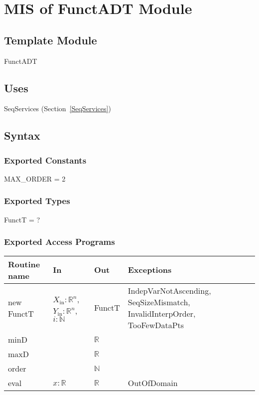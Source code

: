 \documentclass[12pt, titlepage]{article}
\begin{document}
\newpage


\section{MIS of FunctADT Module} \label{FunctADT}

\subsection{Template Module}

FunctADT

\subsection {Uses}

SeqServices (Section~\ref{SeqServices})

\subsection {Syntax}

\subsubsection {Exported Constants}

MAX\_ORDER = 2

\subsubsection {Exported Types}

FunctT = ?

\subsubsection {Exported Access Programs}

\begin{tabular}{| l | l | l | p{5cm} |}
\hline
\textbf{Routine name} & \textbf{In} & \textbf{Out} & \textbf{Exceptions}\\
\hline
new FunctT & $X_\text{in}: \mathbb{R}^n$, $Y_\text{in}: \mathbb{R}^n$, $i: \mathbb{N}$ &
                                                                           FunctT
                                                   &
                                                     IndepVarNotAscending,\newline
                                                     SeqSizeMismatch, \newline
                                                     InvalidInterpOrder,
                                                     \newline TooFewDataPts\\
\hline
minD & ~ & $\mathbb{R}$ & ~\\
\hline
maxD & ~ & $\mathbb{R}$ & ~\\
\hline
order & ~ & $\mathbb{N}$ & ~\\
\hline
eval & $x: \mathbb{R}$ & $\mathbb{R}$ & OutOfDomain\\
\hline

\end{tabular}
\end{document}
